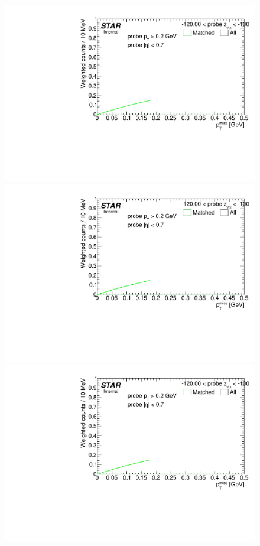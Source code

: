 \begin{figure}[h!]
{}~
\parbox{0.24\textwidth}{
  \centering
  \includegraphics[width=\linewidth,page=4]{graphics/correctionsToEff/TOF_tagAndProbe/Fitting_effVsZVtx_mc.CPT2.pdf}\\
  \includegraphics[width=\linewidth,page=6]{graphics/correctionsToEff/TOF_tagAndProbe/Fitting_effVsZVtx_mc.CPT2.pdf}\\
  \includegraphics[width=\linewidth,page=8]{graphics/correctionsToEff/TOF_tagAndProbe/Fitting_effVsZVtx_mc.CPT2.pdf}\\
}
\end{figure}
